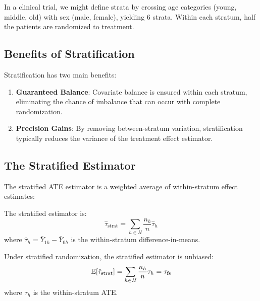 \begin{example}
In a clinical trial, we might define strata by crossing age categories (young, middle, old) with sex (male, female), yielding 6 strata. Within each stratum, half the patients are randomized to treatment.
\end{example}

\subsection{Benefits of Stratification}

Stratification has two main benefits:

\begin{enumerate}
    \item \textbf{Guaranteed Balance}: Covariate balance is ensured within each stratum, eliminating the chance of imbalance that can occur with complete randomization.

    \item \textbf{Precision Gains}: By removing between-stratum variation, stratification typically reduces the variance of the treatment effect estimator.
\end{enumerate}

\subsection{The Stratified Estimator}

The stratified ATE estimator is a weighted average of within-stratum effect estimates:

\begin{definition}
\label{def:stratified_ate}
The stratified estimator is:
\begin{equation}
\hat{\tau}_{\text{strat}} = \sum_{h \in H} \frac{n_h}{n} \hat{\tau}_h
\label{eq:strat_ate}
\end{equation}
where $\hat{\tau}_h = \bar{Y}_{1h} - \bar{Y}_{0h}$ is the within-stratum difference-in-means.
\end{definition}

\begin{theorem}
Under stratified randomization, the stratified estimator is unbiased:
\begin{equation}
\mathbb{E}[\hat{\tau}_{\text{strat}}] = \sum_{h \in H} \frac{n_h}{n} \tau_h = \tau_{\text{fs}}
\end{equation}
where $\tau_h$ is the within-stratum ATE.
\end{theorem}

